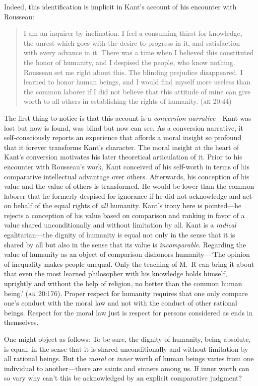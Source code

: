 \documentclass[12pt]{article}
\begin{document}
Indeed, this identification is implicit in Kant's account of his encounter with Rousseau: 
\begin{quote}
	I am an inquirer by inclination. I feel a consuming thirst for knowledge, the unrest which goes with the desire to progress in it, and satisfaction with every advance in it. There was a time when I believed this constituted the honor of humanity, and I despised the people, who know nothing. Rousseau set me right about this. The blinding prejudice disappeared. I learned to honor human beings, and I would find myself more useless than the common laborer if I did not believe that this attitude of mine can give worth to all others in establishing the rights of humanity. (\textsc{ak} 20:44) 
\end{quote}
The first thing to notice is that this account is a \emph{conversion narrative}---Kant was lost but now is found, was blind but now can see. As a conversion narrative, it self-consciously reports an experience that affords a moral insight so profound that it forever transforms Kant's character. The moral insight at the heart of Kant's conversion motivates his later theoretical articulation of it. Prior to his encounter with Rousseau's work, Kant conceived of his self-worth in terms of his comparative intellectual advantage over others. Afterwards, his conception of his value and the value of others is transformed. He would be lower than the common laborer that he formerly despised for ignorance if he did not acknowledge and act on behalf of the equal rights of \emph{all} humanity. Kant's irony here is pointed---he rejects a conception of his value based on comparison and ranking in favor of a value shared unconditionally and without limitation by all. Kant is a \emph{radical} egalitarian---the dignity of humanity is equal not only in the sense that it is shared by all but also in the sense that its value is \emph{incomparable}. Regarding the value of humanity as an object of comparison dishonors humanity---`The opinion of inequality makes people unequal. Only the teaching of M.\ R can bring it about that even the most learned philosopher with his knowledge holds himself, uprightly and without the help of religion, no better than the common human being.' (\textsc{ak} 20:176). Proper respect for humanity requires that one only compare one's conduct with the moral law and not with the conduct of other rational beings. Respect for the moral law just is respect for persons considered as ends in themselves.

One might object as follows: To be sure, the dignity of humanity, being absolute, is equal, in the sense that it is shared unconditionally and without limitation by all rational beings. But the \emph{moral} or \emph{inner} worth of human beings varies from one individual to another---there are saints and sinners among us. If inner worth can so vary why can't this be acknowledged by an explicit comparative judgment?
\end{document}
